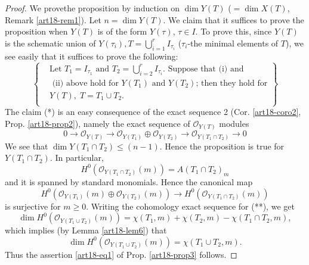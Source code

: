 \begin{proof}
We prove\pageoriginale the proposition by induction on $\dim Y(T)$ ($=\dim X(T)$, \cf Remark \ref{art18-rem1}). Let $n = \dim Y(T)$. We claim that it suffices to prove the proposition when $Y (T)$ is of the form $Y(\tau)$, $\tau \in I$. To prove this, since $Y(T)$ is the schematic union of $Y(\tau_i), T = \bigcup\limits^r_{i=1} I_{\tau_i} $ ($\tau_i$-the minimal elements of $T$), we see easily that it suffices to prove the following:
\begin{equation*}
\left\{
\begin{aligned}
& \text{Let }  T_1 = I_{\tau_1} \text{ and  } T_2 = \bigcup\limits^r_{i=2} I_{\tau_i}. \text{ Suppose that (i) and }\\
& \text{ (ii)  above hold for $Y(T_1)$ and $Y(T_2)$; then they hold for}\\
&  Y (T), \;   T = T_1 \cup T_2.\\
\end{aligned}
\right\} \tag{*}
\end{equation*}
The claim (*) is an easy consequence of the exact sequence 2 (\cf Cor. \ref{art18-coro2}, Prop. \ref{art18-prop2}), namely the exact sequence of $\mathscr{O}_{Y(T)}$ modules 
\begin{equation*}
0 \to \mathscr{O}_{Y(T)} \to \mathscr{O}_{Y(T_1)} \oplus \mathscr{O}_{Y(T_2)} \to\mathscr{O}_{Y (T_1 \cap T_2)} \to 0 \tag{**}
\end{equation*}
We see that $\dim Y(T_1 \cap T_2) \leqslant (n-1)$. Hence the proposition is true for $Y (T_1 \cap T_2)$. In particular,
$$
H^0 (\mathscr{O}_{Y(T_1 \cap T_2)} (m)) =A (T_1 \cap T_2)_m
$$
and it is spanned by standard monomials. Hence the canonical map
\begin{equation*}
H^0 (\mathscr{O}_{Y(T_1)} (m) \oplus \mathscr{O}_{Y(T_2)} (m)) \to H^0 (\mathscr{O}_{Y(T_1 \cap T_2)}(m)) \tag{***}
\end{equation*}
is surjective for $m \geqslant 0$. Writing the cohomology exact sequence for (**), we get
$$
\dim H^0 (\mathscr{O}_{Y(T_1 \cup T_2)} (m))  = \chi(T_1, m) + \chi (T_2,m) - \chi (T_1 \cap T_2, m),
$$ 
which implies (by Lemma \ref{art18-lem6}) that 
$$
\dim H^0(\mathscr{O}_{Y(T_1\cup T_2)}(m)) =\chi (T_1\cup T_2, m).
$$
Thus the assertion \ref{art18-eq1} of Prop. \ref{art18-prop3} follows.


\end{proof}
